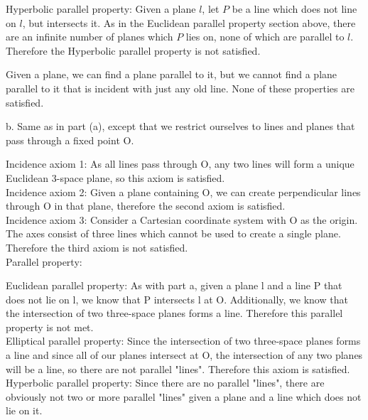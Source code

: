 \documentclass[12pt,letterpaper]{article}
\begin{document}
Hyperbolic parallel property:  Given a plane $l$, let $P$  be a line which does not line on $l$, but intersects it.  As in the Euclidean parallel property section above, there are an infinite number of planes which $P$ lies on, none of which are parallel to $l$.  Therefore the Hyperbolic parallel property is not satisfied. 


Given a plane, we can find a plane parallel to it, but we cannot find a plane parallel to it that is incident with just any old line.  None of these properties are satisfied.

\newpage

b. Same as in part (a), except that we restrict ourselves to lines and planes that pass through a fixed point O.

Incidence axiom 1: As all lines pass through O, any two lines will form a unique Euclidean 3-space plane, so this axiom is satisfied.\\


Incidence axiom 2: Given a plane containing O, we can create perpendicular lines through O in that plane, therefore the second axiom is satisfied.\\


Incidence axiom 3: Consider a Cartesian coordinate system with O as the origin.  The axes consist of three lines which cannot be used to create a single plane.  Therefore the third axiom is not satisfied.\\


Parallel property:

Euclidean parallel property: As with part a, given a plane l and a line P that does not lie on l, we know that P intersects l at O.  Additionally, we know that the intersection of two three-space planes forms a line.  Therefore this parallel property is not met.\\

Elliptical parallel property: Since the intersection of two three-space planes forms a line and since all of our planes intersect at O, the intersection of any two planes will be a line, so there are not parallel "lines". Therefore this axiom is satisfied.\\

Hyperbolic parallel property: Since there are no parallel "lines", there are obviously not two or more parallel "lines" given a plane and a line which does not lie on it. \\




\newpage 
\end{document}
